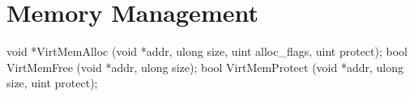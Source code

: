 \section{Memory Management}
\label{sec:abi:memory}

\begin{paldef}
void *VirtMemAlloc (void *addr, ulong size,
                    uint alloc_flags, uint protect);
bool VirtMemFree (void *addr, ulong size);
bool VirtMemProtect (void *addr, ulong size, uint protect);
\end{paldef}





